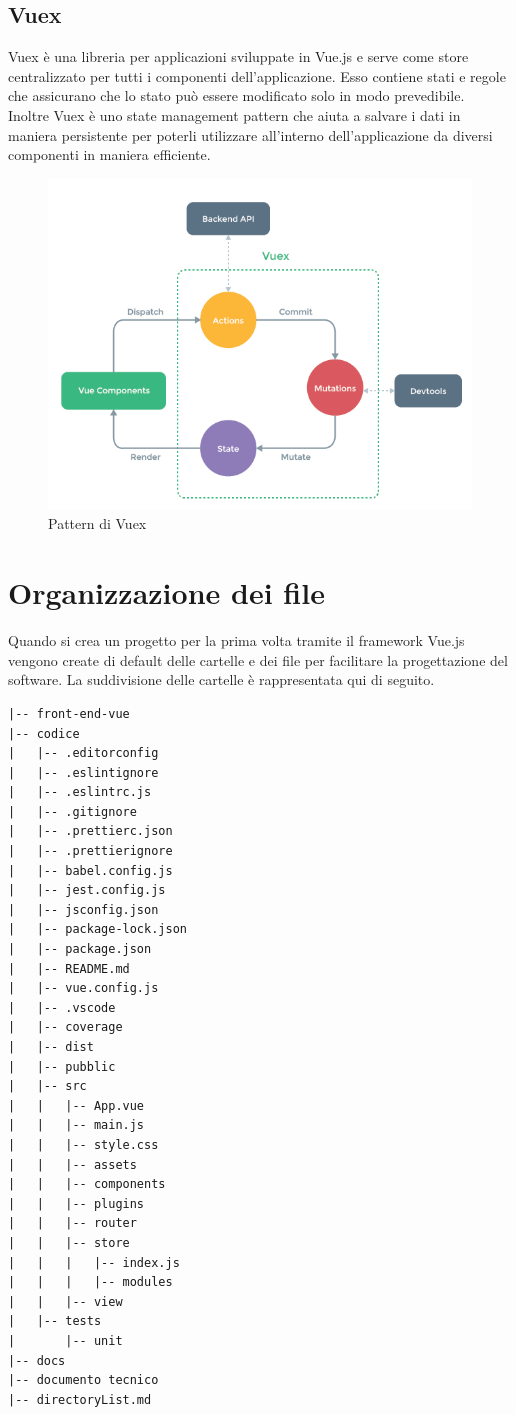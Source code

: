 \subsection{Vuex}
Vuex è una libreria  per applicazioni sviluppate in Vue.js e serve come store centralizzato per tutti i componenti dell'applicazione. Esso contiene stati e regole che assicurano che lo stato può essere modificato solo in modo prevedibile.\\
Inoltre Vuex è uno state management pattern che aiuta a salvare i dati in maniera persistente per poterli utilizzare all'interno dell'applicazione da diversi componenti in maniera efficiente.
\begin{figure}[H]
	\begin{center}
		\includegraphics[width=0.7\columnwidth]{immagini/vuex.png}
		\caption{Pattern di Vuex}
	\end{center}
\end{figure}
\section{Organizzazione dei file}
Quando si crea un progetto per la prima volta tramite il framework Vue.js vengono create di default delle cartelle e dei file per facilitare la progettazione del software. La suddivisione delle cartelle è rappresentata qui di seguito.

\begin{lstlisting}
|-- front-end-vue
|-- codice
|   |-- .editorconfig
|   |-- .eslintignore
|   |-- .eslintrc.js
|   |-- .gitignore
|   |-- .prettierc.json
|   |-- .prettierignore
|   |-- babel.config.js
|   |-- jest.config.js
|   |-- jsconfig.json
|   |-- package-lock.json
|   |-- package.json
|   |-- README.md
|   |-- vue.config.js
|   |-- .vscode
|   |-- coverage
|   |-- dist
|   |-- pubblic
|   |-- src
|   |   |-- App.vue
|   |   |-- main.js
|   |   |-- style.css
|   |   |-- assets
|   |   |-- components
|   |   |-- plugins
|   |   |-- router
|   |   |-- store
|   |   |   |-- index.js
|   |   |   |-- modules
|   |   |-- view
|   |-- tests
|       |-- unit
|-- docs
|-- documento tecnico
|-- directoryList.md
\end{lstlisting}

